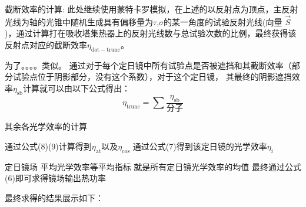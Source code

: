 \documentclass[../main.tex]{subfiles}
\begin{document}
截断效率的计算: 此处继续使用蒙特卡罗模拟，在上述的以反射点为顶点，主反射光线为轴的光锥中随机生成具有偏移量为\(\tau\),\(\sigma\)的某一角度的试验反射光线(向量 \(\vec S\))，通过计算打在吸收塔集热器上的反射光线数与总试验次数的比例，最终获得该反射点对应的截断效率\(\eta _{\mathrm{dot}{-}\mathrm{trunc}}\)。

为了。。。。类似。
通过对于每个定日镜中所有试验点是否被遮挡和其截断效率（部分试验点位于阴影部分，没有这个系数），对于这个定日镜，
其最终的阴影遮挡效率\(\eta _{\mathrm{s b}}\)计算就可以由以下公式得出：
\begin{equation}
\eta _{\mathrm{trunc}} = \sum \frac{\eta _{\mathrm{s b}}}{分子}
\end{equation}

其余各光学效率的计算

通过公式(8)(9)计算得到\(\eta _{\mathrm{at}}\)以及\(\eta _{\cos}\)
通过公式(7)得到该定日镜的光学效率\(\eta_{i}\)

定日镜场 平均光学效率等平均指标 就是所有定日镜光学效率的均值
最终通过公式(6)即可求得镜场输出热功率

最终求得的结果展示如下：

\end{document}
